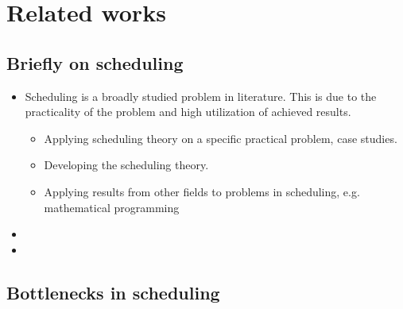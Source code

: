 \chapter{Related works}

\section*{Briefly on scheduling}

\begin{itemize}
    \item Scheduling is a broadly studied problem in literature. This is due to the practicality
        of the problem and high utilization of achieved results.
    \begin{itemize}
        \item Applying scheduling theory on a specific practical problem, case studies.
        \item Developing the scheduling theory.
        \item Applying results from other fields to problems in scheduling, e.g. mathematical programming
            \citep{KNOP2018}
    \end{itemize}

    \item \todo{}

    \item {}

\end{itemize}
    
\section*{Bottlenecks in scheduling}


